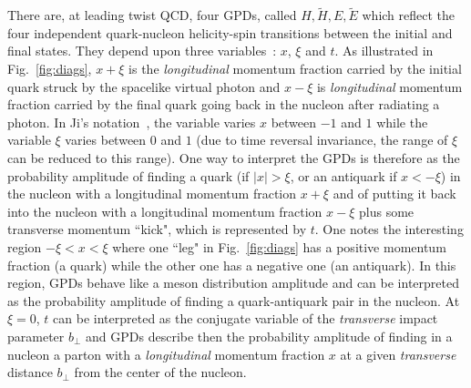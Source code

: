 There are, at leading twist QCD, four GPDs, called
$H, \tilde H, E, \tilde E$ which reflect the four independent
quark-nucleon helicity-spin transitions between the initial
and final states. They depend upon three variables~: 
$x$, $\xi$ and $t$. As illustrated in Fig.~\ref{fig:diags},
$x+\xi$ is the {\it longitudinal} momentum fraction carried by 
the initial quark struck by the spacelike virtual photon and $x-\xi$ is 
{\it longitudinal} momentum fraction carried by the final quark going 
back in the nucleon after radiating a photon. In Ji's notation~\cite{Ji:1996nm},
the variable varies $x$ between $-1$ and $1$ while the variable $\xi$ 
varies between $0$ and $1$ (due to time reversal invariance, the range of $\xi$ 
can be reduced to this range). One way to interpret the GPDs is therefore as
the probability amplitude of finding a quark (if $|x| > \xi$, or an antiquark 
if $x<-\xi$) in the nucleon with a longitudinal momentum fraction $x+\xi$
and of putting it back into the nucleon with a longitudinal momentum
fraction $x-\xi$ plus some transverse momentum ``kick", which is
represented by $t$. One notes the interesting region $ -\xi < x < \xi$ 
where one ``leg" in Fig.~\ref{fig:diags} 
has a positive momentum fraction (a quark) while the other one has a negative one
(an antiquark). In this region, GPDs behave like a meson distribution amplitude
and can be interpreted as the probability amplitude of finding 
a quark-antiquark pair in the nucleon. 
At $\xi=0$, $t$ can be interpreted as the conjugate variable of the
{\it transverse} impact parameter $b_\perp$ and GPDs describe then the probability 
amplitude of finding in a nucleon a parton with a {\it longitudinal} momentum 
fraction $x$ at a given {\it transverse} distance $b_\perp$ from the
center of the nucleon.

